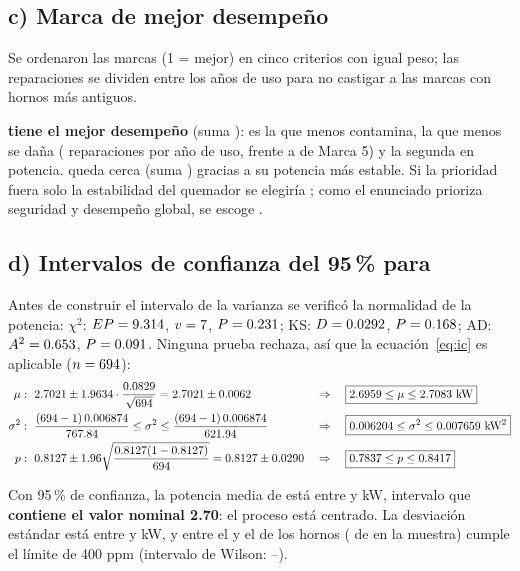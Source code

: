 \documentclass[11pt]{article}
\begin{document}
\subsection*{c) Marca de mejor desempeño}
Se ordenaron las marcas (1 = mejor) en cinco criterios con igual peso; las reparaciones se dividen entre los años de
uso para no castigar a las marcas con hornos más antiguos.
\begin{lectura}
\textbf{\mejor{} tiene el mejor desempeño} (suma \sumaMejor): es la que menos contamina, la que menos se daña
(\repAnioMejor{} reparaciones por año de uso, frente a \repAnioPeor{} de Marca 5) y la segunda en potencia.
\segunda{} queda cerca (suma \sumaSegunda) gracias a su potencia más estable. Si la prioridad fuera solo la
estabilidad del quemador se elegiría \segunda; como el enunciado prioriza seguridad y desempeño global, se escoge
\mejor{}.
\end{lectura}

\subsection*{d) Intervalos de confianza del 95\,\% para \mejor}
Antes de construir el intervalo de la varianza se verificó la normalidad de la potencia: $\chi^2$: $EP=9.314$,
$v=7$, $P=0.231$; KS: $D=0.0292$, $P=0.168$; AD: $A^2=0.653$,
$P=0.091$. Ninguna prueba rechaza, así que la ecuación~\eqref{eq:ic} es aplicable ($n=694$):
\begin{align*}
\mu&:\ \muMedia\pm\muT\cdot\frac{\muS}{\sqrt{\nMejor}}=\muMedia\pm\muE
&&\Rightarrow\quad \boxed{\muLi\le\mu\le\muLs\ \text{kW}}\\
\sigma^2&:\ \frac{(\nMejor-1)\,\vaSdos}{\vaChiDer}\le\sigma^2\le\frac{(\nMejor-1)\,\vaSdos}{\vaChiIzq}
&&\Rightarrow\quad \boxed{\vaLi\le\sigma^2\le\vaLs\ \text{kW}^2}\\
p&:\ \prP\pm1.96\sqrt{\frac{\prP(1-\prP)}{\nMejor}}=\prP\pm\prE
&&\Rightarrow\quad \boxed{\prLi\le p\le\prLs}
\end{align*}
\begin{lectura}
Con 95\,\% de confianza, la potencia media de \mejor{} está entre \muLi{} y \muLs{} kW, intervalo que
\textbf{contiene el valor nominal 2.70}: el proceso está centrado. La desviación estándar está entre \sLi{} y
\sLs{} kW, y entre el \prLi{} y el \prLs{} de los hornos (\prX{} de \nMejor{} en la muestra) cumple el límite de
400 ppm (intervalo de Wilson: \prWLi–\prWLs).
\end{lectura}
\end{document}
